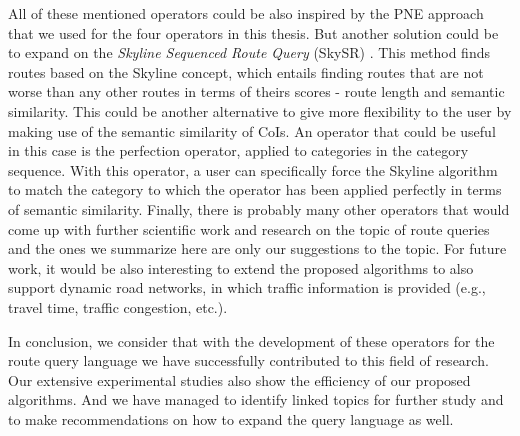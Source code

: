 All of these mentioned operators could be also inspired by the PNE approach that we used for the four operators in this thesis. But another solution could be to expand on the \textit{Skyline Sequenced Route Query} (SkySR) \cite{skyline}. This method finds routes based on the Skyline concept, which entails finding routes that are not worse than any other routes in terms of theirs scores - route length and semantic similarity. This could be another alternative to give more flexibility to the user by making use of the semantic similarity of CoIs. An operator that could be useful in this case is the perfection operator, applied to categories in the category sequence. With this operator, a user can specifically force the Skyline algorithm to match the category to which the operator has been applied perfectly in terms of semantic similarity. Finally, there is probably many other operators that would come up with further scientific work and research on the topic of route queries and the ones we summarize here are only our suggestions to the topic. For future work, it would be also interesting to extend the proposed algorithms to also support dynamic road networks, in which traffic information is provided (e.g., travel time, traffic congestion, etc.).
\enlargethispage{60pt}

In conclusion, we consider that with the development of these operators for the route query language we have successfully contributed to this field of research. Our extensive experimental studies also show the efficiency of our proposed algorithms. And we have managed to identify linked topics for further study and to make recommendations on how to expand the query language as well. 

\pagebreak
